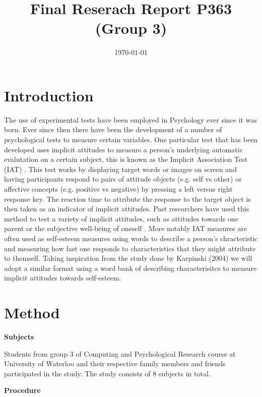 \documentclass[11pt]{article}
\date{\today}
\title{Final Reserach Report P363 (Group 3)}
\begin{document}
\maketitle
\tableofcontents




\section{Introduction}
\label{sec:orga3f60a9}

The use of experimental tests have been employed in Psychology ever since it was born. Ever since then there have been the development of a number of psychological tests to measure certain variables. One particular test that has been developed uses implicit attitudes to measure a person's underlying automatic evalutation on a certain subject, this is known as the Implicit Association Test (IAT) \cite{greenwald_mcghee_schwartz_1998}. This test works by displaying target words or images on screen and having participants respond to pairs of attitude objects (e.g. self vs other) or affective concepts (e.g. positive vs negative) by pressing a left versus right response key. The reaction time to attribute the response to the target object is then taken as an indicator of implicit attitudes. Past researchers have used this method to test a variety of implicit attitudes, such as attitudes towards one parent \cite{Yang_2013} or the subjective well-being of oneself \cite{Walker_Schimmack_2008}. More notably IAT measures are often used as self-esteem measures using words to describe a person's chracteristic and measuring how fast one responds to characteristics that they might attribute to themself. Taking inspiration from the study done by Karpinski (2004) we will adopt a similar format using a word bank of describing characterisitcs to measure implicit attitudes towards self-esteem. 

\section{Method}
\label{sec:org35505af}

\textbf{Subjects}

Students from group 3 of Computing and Psychological Research course at University of Waterloo and their respective family members and friends participated in the study. The study consists of 8 subjects in total. 

\textbf{Procedure}
\end{document}
